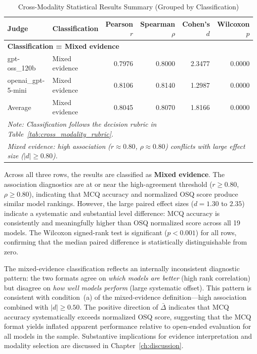 \begin{table}[htbp]
\centering
\caption{Cross-Modality Statistical Results Summary (Grouped by Classification)}
\label{tab:cross_modality_summary_mirror}
\begin{tabular}{l l r r r r}
\toprule
Judge & Classification & Pearson $r$ & Spearman $\rho$ & Cohen's $d$ & Wilcoxon $p$ \\
\midrule
\multicolumn{6}{l}{\textbf{Classification = Mixed evidence}} \\
\midrule
gpt-oss\_120b        & Mixed evidence & 0.7976 & 0.8000 & 2.3477 & 0.0000 \\
openai\_gpt-5-mini  & Mixed evidence & 0.8106 & 0.8140 & 1.2987 & 0.0000 \\
Average             & Mixed evidence & 0.8045 & 0.8070 & 1.8166 & 0.0000 \\
\midrule
\multicolumn{6}{l}{\footnotesize \textit{Note: Classification follows the decision rubric in Table~\ref{tab:cross_modality_rubric}.}} \\
\multicolumn{6}{l}{\footnotesize \textit{Mixed evidence: high association ($r \approx 0.80$, $\rho \approx 0.80$) conflicts with large effect size ($|d| \geq 0.80$).}} \\
\bottomrule
\end{tabular}
\end{table}

Across all three rows, the results are classified as \textbf{Mixed evidence}. The association diagnostics are at or near the high-agreement threshold ($r \geq 0.80$, $\rho \geq 0.80$), indicating that MCQ accuracy and normalized OSQ score produce similar model rankings. However, the large paired effect sizes ($d = 1.30$ to $2.35$) indicate a systematic and substantial level difference: MCQ accuracy is consistently and meaningfully higher than OSQ normalized score across all 19 models. The Wilcoxon signed-rank test is significant ($p < 0.001$) for all rows, confirming that the median paired difference is statistically distinguishable from zero.

The mixed-evidence classification reflects an internally inconsistent diagnostic pattern: the two formats agree on \emph{which models are better} (high rank correlation) but disagree on \emph{how well models perform} (large systematic offset). This pattern is consistent with condition~(a) of the mixed-evidence definition---high association combined with $|d| \geq 0.50$. The positive direction of $\bar{\Delta}$ indicates that MCQ accuracy systematically exceeds normalized OSQ score, suggesting that the MCQ format yields inflated apparent performance relative to open-ended evaluation for all models in the sample. Substantive implications for evidence interpretation and modality selection are discussed in Chapter~\ref{ch:discussion}.

